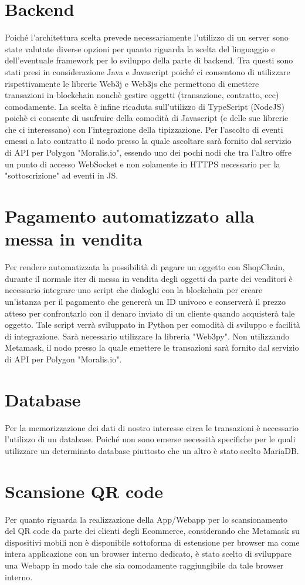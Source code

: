 \documentclass[a4paper, 12pt]{article}
\begin{document}
\section*{Backend}
Poiché l'architettura scelta prevede necessariamente l'utilizzo di un server sono state valutate diverse opzioni per quanto riguarda la scelta del linguaggio e dell'eventuale framework per lo sviluppo della parte di backend. Tra questi sono stati presi in considerazione Java e Javascript poiché ci consentono di utilizzare rispettivamente le librerie Web3j e Web3js che permettono di emettere transazioni in blockchain nonchè gestire oggetti (transazione, contratto, ecc) comodamente. La scelta è infine ricaduta sull'utilizzo di TypeScript (NodeJS) poichè ci consente di usufruire della comodità di Javascript (e delle sue librerie che ci interessano) con l'integrazione della tipizzazione. Per l'ascolto di eventi emessi a lato contratto il nodo presso la quale ascoltare sarà fornito dal servizio di API per Polygon "Moralis.io", essendo uno dei pochi nodi che tra l'altro offre un punto di accesso WebSocket e non solamente in HTTPS necessario per la "sottoscrizione" ad eventi in JS.

\section*{Pagamento automatizzato alla messa in vendita}
Per rendere automatizzata la possibilità di pagare un oggetto con ShopChain, durante il normale iter di messa in vendita degli oggetti da parte dei venditori è necessario integrare uno script che dialoghi con la blockchain per creare un'istanza per il pagamento che genererà un ID univoco e conserverà il prezzo atteso per confrontarlo con il denaro inviato di un cliente quando acquisterà tale oggetto.
Tale script verrà sviluppato in Python per comodità di sviluppo e facilità di integrazione. Sarà necessario utilizzare la libreria "Web3py".
Non utilizzando Metamask, il nodo presso la quale emettere le transazioni sarà fornito dal servizio di API per Polygon "Moralis.io".

\section*{Database}
Per la memorizzazione dei dati di nostro interesse circa le transazioni è necessario l'utilizzo di un database. Poiché non sono emerse necessità specifiche per le quali utilizzare un determinato database piuttosto che un altro è stato scelto MariaDB.

\section*{Scansione QR code}
Per quanto riguarda la realizzazione della App/Webapp per lo scansionamento del QR code da parte dei clienti degli Ecommerce, considerando che Metamask su dispositivi mobili non è disponibile sottoforma di estensione per browser ma come intera applicazione con un browser interno dedicato, è stato scelto di sviluppare una Webapp in modo tale che sia comodamente raggiungibile da tale browser interno.
\end{document}
